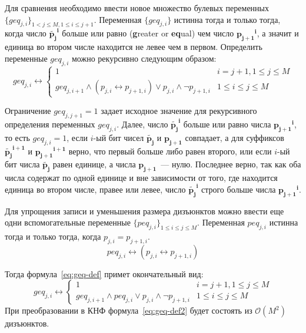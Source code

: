 Для сравнения необходимо ввести новое множество булевых переменных $\{\mathit{geq}_{j,i}\}_{1 < j \leq M, 1 \leq i \leq j + 1}$.
Переменная $\{\mathit{geq}_{j,i}\}$ истинна тогда и только тогда, когда число $\tilde{\mathbf{p_{j}}}^{\mathbf{i}}$ больше или равно (\textbf{g}reater or \textbf{eq}ual) чем число $\mathbf{p_{j + 1}}^{\mathbf{i}}$, а значит и единица во втором числе находится не левее чем в первом. 
Определить переменные $\mathit{geq}_{j,i}$ можно рекурсивно следующим образом:
%
\begin{equation}
\label{eq:geq-def}
  \mathit{geq}_{j,i} \leftrightarrow 
    \begin{cases} 
      1                               & i = j + 1, 1 \leq j \leq M \\
      \mathit{geq}_{j,i + 1} \wedge \left(p_{j,i} \leftrightarrow p_{j + 1, i}\right) \vee p_{j,i} \wedge \neg p_{j + 1, i}  & 1 \leq i \leq j \leq M
    \end{cases} 
\end{equation}

Ограничение $\mathit{geq}_{j,j + 1} = 1$ задает исходное значение для рекурсивного определения переменных $\mathit{geq}_{j,i}$.
Далее, число $\tilde{\mathbf{p_{j}}}^{\mathbf{i}}$ больше или равно числа $\mathbf{p_{j + 1}}^{\mathbf{i}}$, то есть $\mathit{geq}_{j,i} = 1$, если $i$-ый бит чисел $\tilde{\mathbf{p_{j}}}$ и $\mathbf{p_{j + 1}}$ совпадает, а для суффиксов $\tilde{\mathbf{p_{j}}}^{\mathbf{i + 1}}$ и $\mathbf{p_{j + 1}}^{\mathbf{i + 1}}$ верно, что первый больше либо равен второго, или если $i$-ый бит числа $\tilde{\mathbf{p_{j}}}$ равен единице, а числа $\mathbf{p_{j + 1}}$~{---} нулю.
Последнее верно, так как оба числа содержат по одной единице и вне зависимости от того, где находится единица во втором числе, правее или левее, число $\tilde{\mathbf{p_{j}}}^{\mathbf{i}}$ строго больше числа $\mathbf{p_{j + 1}}^{\mathbf{i}}$.

Для упрощения записи и уменьшения размера дизъюнктов можно ввести еще одни вспомогательные переменные $\{\mathit{peq}_{j,i}\}_{1 \leq i \leq j \leq M}$.
Переменная $\mathit{peq}_{j,i}$ истинна тогда и только тогда, когда $p_{j,i} = p_{j + 1,i}$.
%
\begin{equation}
\label{eq:peq-def}
  \mathit{peq}_{j,i} \leftrightarrow \left(p_{j,i} \leftrightarrow p_{j + 1, i}\right) 
\end{equation}


Тогда формула~\eqref{eq:geq-def} примет окончательный вид:
%
\begin{equation}
\label{eq:geq-def2}
  \mathit{geq}_{j,i} \leftrightarrow 
    \begin{cases} 
      1                               & i = j + 1, 1 \leq j \leq M \\
      \mathit{geq}_{j,i + 1} \wedge \mathit{peq}_{j,i} \vee p_{j,i} \wedge \neg p_{j + 1, i}  & 1 \leq i \leq j \leq M
    \end{cases} 
\end{equation}
%
При преобразовании в КНФ формула~\eqref{eq:geq-def2} будет состоять из $\mathcal{O}\left(M^{2}\right)$ дизъюнктов.

